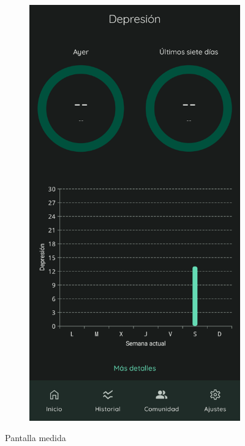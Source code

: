 \begin{figure}[htbp]
\begin{subfigure}[c]{0.4\textwidth}
                	\end{subfigure}
                	\hspace{0.1\textwidth}
                	\begin{subfigure}[c]{0.4\textwidth}
                		\centering
                		\includegraphics[width=1\linewidth]{figures/pantallas/Medida con nulos.png}
                	\end{subfigure}
                	\caption{Pantalla medida}
                	\label{figure:implementacion:pantalla:medida}
                \end{figure}

